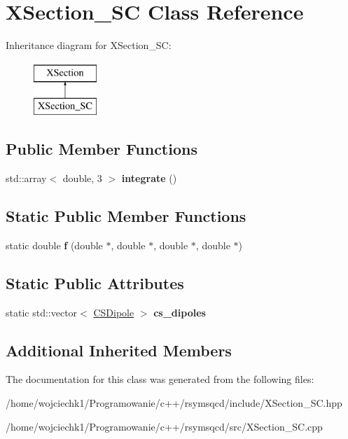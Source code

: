 \hypertarget{classXSection__SC}{}\section{X\+Section\+\_\+\+SC Class Reference}
\label{classXSection__SC}
Inheritance diagram for X\+Section\+\_\+\+SC\+:\begin{figure}[H]
\begin{center}
\leavevmode
\includegraphics[height=2.000000cm]{classXSection__SC}
\end{center}
\end{figure}
\subsection*{Public Member Functions}
\begin{DoxyCompactItemize}
\item 
\mbox{\label{classXSection__SC_af1dd47bccac55582b219cd99458e311e}} 
std\+::array$<$ double, 3 $>$ {\bfseries integrate} ()
\end{DoxyCompactItemize}
\subsection*{Static Public Member Functions}
\begin{DoxyCompactItemize}
\item 
\mbox{\label{classXSection__SC_a49b7b2b591948a17b4133397c41ae290}} 
static double {\bfseries f} (double $\ast$, double $\ast$, double $\ast$, double $\ast$)
\end{DoxyCompactItemize}
\subsection*{Static Public Attributes}
\begin{DoxyCompactItemize}
\item 
\mbox{\label{classXSection__SC_ac00d0eca18be8844a136d3bd335eb7da}} 
static std\+::vector$<$ \hyperlink{classCSDipole}{C\+S\+Dipole} $>$ {\bfseries cs\+\_\+dipoles}
\end{DoxyCompactItemize}
\subsection*{Additional Inherited Members}


The documentation for this class was generated from the following files\+:\begin{DoxyCompactItemize}
\item 
/home/wojciechk1/\+Programowanie/c++/rsymsqcd/include/X\+Section\+\_\+\+S\+C.\+hpp\item 
/home/wojciechk1/\+Programowanie/c++/rsymsqcd/src/X\+Section\+\_\+\+S\+C.\+cpp\end{DoxyCompactItemize}
